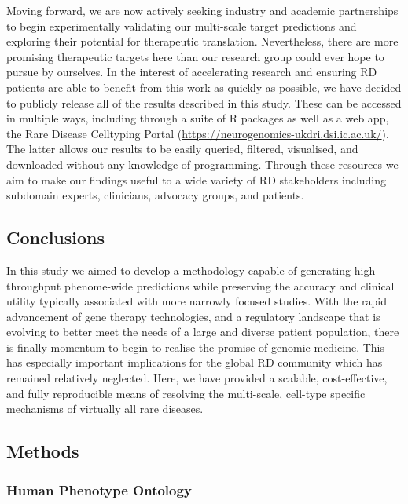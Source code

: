 \documentclass[
]{article}
\begin{document}
Moving forward, we are now actively seeking industry and academic
partnerships to begin experimentally validating our multi-scale target
predictions and exploring their potential for therapeutic translation.
Nevertheless, there are more promising therapeutic targets here than our
research group could ever hope to pursue by ourselves. In the interest
of accelerating research and ensuring RD patients are able to benefit
from this work as quickly as possible, we have decided to publicly
release all of the results described in this study. These can be
accessed in multiple ways, including through a suite of R packages as
well as a web app, the Rare Disease Celltyping Portal
(\url{https://neurogenomics-ukdri.dsi.ic.ac.uk/}). The latter allows our
results to be easily queried, filtered, visualised, and downloaded
without any knowledge of programming. Through these resources we aim to
make our findings useful to a wide variety of RD stakeholders including
subdomain experts, clinicians, advocacy groups, and patients.

\subsection{Conclusions}\label{sec-conclusions}

In this study we aimed to develop a methodology capable of generating
high-throughput phenome-wide predictions while preserving the accuracy
and clinical utility typically associated with more narrowly focused
studies. With the rapid advancement of gene therapy technologies, and a
regulatory landscape that is evolving to better meet the needs of a
large and diverse patient population, there is finally momentum to begin
to realise the promise of genomic medicine. This has especially
important implications for the global RD community which has remained
relatively neglected. Here, we have provided a scalable, cost-effective,
and fully reproducible means of resolving the multi-scale, cell-type
specific mechanisms of virtually all rare diseases.

\subsection{Methods}\label{sec-methods}

\subsubsection{Human Phenotype Ontology}\label{human-phenotype-ontology}
\end{document}
